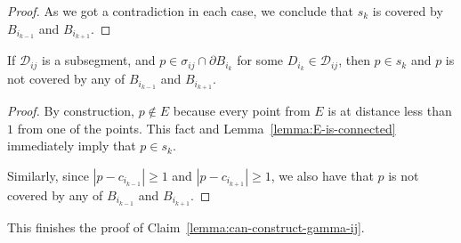 \begin{appendices}
\begin{proof}
As we got a contradiction in each case, we conclude that $s_k$ is covered by $B_{i_{k-1}}$ and $B_{i_{k+1}}$.
\end{proof}


\begin{lemma}
If $\mathcal{D}_{ij}$ is a subsegment, and $p\in \sigma_{ij}\cap\partial{B_{i_k}}$ for some $D_{i_k}\in\mathcal{D}_{ij}$, then $p\in s_k$ and $p$ is not covered by any of $B_{i_{k-1}}$ and $B_{i_{k+1}}$.
\end{lemma}

\begin{proof}
By construction, $p\notin E$ because every point from $E$ is at distance less than $1$ from one of the points. This fact and Lemma~\ref{lemma:E-is-connected} immediately imply that $p\in s_k$.

Similarly, since $|p - c_{i_{k-1}}|\geq 1$ and $|p - c_{i_{k+1}}|\geq 1$, we also have that $p$ is not covered by any of $B_{i_{k-1}}$ and $B_{i_{k+1}}$.
\end{proof}

This finishes the proof of Claim~\ref{lemma:can-construct-gamma-ij}.



\end{appendices}
